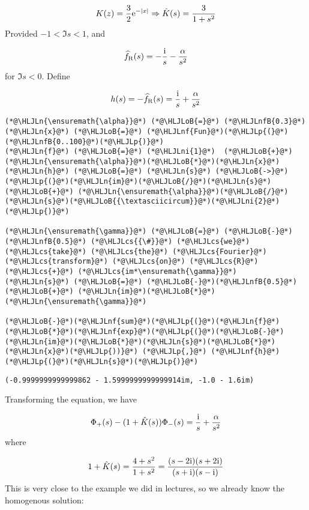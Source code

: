 \documentclass[12pt,landscape]{article}
\newcommand{\HLJLn}[1]{#1}
\newcommand{\HLJLnf}[1]{\textcolor[RGB]{66,102,213}{#1}}
\newcommand{\HLJLnfB}[1]{\textcolor[RGB]{59,151,46}{#1}}
\newcommand{\HLJLni}[1]{\textcolor[RGB]{59,151,46}{#1}}
\newcommand{\HLJLoB}[1]{\textcolor[RGB]{102,102,102}{\textbf{#1}}}
\newcommand{\HLJLp}[1]{#1}
\newcommand{\HLJLcs}[1]{\textcolor[RGB]{153,153,119}{\textit{#1}}}
\def\I{ {\rm i} }
\def\E{ {\rm e} }
\begin{document}
{\[
K(z) =  {3\over 2} \E^{-|x|} \Rightarrow \hat K(s) = {3 \over 1+s^2}
\]
Provided $-1 < \Im s < 1$, and

\[
\widehat f_{\rm R}(s) = -{\I \over s} - {\alpha \over s^2}
\]
for $\Im s < 0$.  Define

\[
h(s) = - \widehat f_{\rm R}(s) = {\I \over s} + {\alpha \over s^2}
\]

\begin{lstlisting}
(*@\HLJLn{\ensuremath{\alpha}}@*) (*@\HLJLoB{=}@*) (*@\HLJLnfB{0.3}@*)
(*@\HLJLn{x}@*) (*@\HLJLoB{=}@*) (*@\HLJLnf{Fun}@*)(*@\HLJLp{(}@*)(*@\HLJLnfB{0..100}@*)(*@\HLJLp{)}@*)
(*@\HLJLn{f}@*) (*@\HLJLoB{=}@*) (*@\HLJLni{1}@*)  (*@\HLJLoB{+}@*) (*@\HLJLn{\ensuremath{\alpha}}@*)(*@\HLJLoB{*}@*)(*@\HLJLn{x}@*)
(*@\HLJLn{h}@*) (*@\HLJLoB{=}@*) (*@\HLJLn{s}@*) (*@\HLJLoB{->}@*) (*@\HLJLp{(}@*)(*@\HLJLn{im}@*)(*@\HLJLoB{/}@*)(*@\HLJLn{s}@*) (*@\HLJLoB{+}@*) (*@\HLJLn{\ensuremath{\alpha}}@*)(*@\HLJLoB{/}@*)(*@\HLJLn{s}@*)(*@\HLJLoB{{\textasciicircum}}@*)(*@\HLJLni{2}@*)(*@\HLJLp{)}@*)

(*@\HLJLn{\ensuremath{\gamma}}@*) (*@\HLJLoB{=}@*) (*@\HLJLoB{-}@*)(*@\HLJLnfB{0.5}@*) (*@\HLJLcs{{\#}}@*) (*@\HLJLcs{we}@*) (*@\HLJLcs{take}@*) (*@\HLJLcs{the}@*) (*@\HLJLcs{Fourier}@*) (*@\HLJLcs{transform}@*) (*@\HLJLcs{on}@*) (*@\HLJLcs{R}@*) (*@\HLJLcs{+}@*) (*@\HLJLcs{im*\ensuremath{\gamma}}@*)
(*@\HLJLn{s}@*) (*@\HLJLoB{=}@*) (*@\HLJLoB{-}@*)(*@\HLJLnfB{0.5}@*) (*@\HLJLoB{+}@*) (*@\HLJLn{im}@*)(*@\HLJLoB{*}@*)(*@\HLJLn{\ensuremath{\gamma}}@*)

(*@\HLJLoB{-}@*)(*@\HLJLnf{sum}@*)(*@\HLJLp{(}@*)(*@\HLJLn{f}@*)(*@\HLJLoB{*}@*)(*@\HLJLnf{exp}@*)(*@\HLJLp{(}@*)(*@\HLJLoB{-}@*)(*@\HLJLn{im}@*)(*@\HLJLoB{*}@*)(*@\HLJLn{s}@*)(*@\HLJLoB{*}@*)(*@\HLJLn{x}@*)(*@\HLJLp{))}@*) (*@\HLJLp{,}@*) (*@\HLJLnf{h}@*)(*@\HLJLp{(}@*)(*@\HLJLn{s}@*)(*@\HLJLp{)}@*)
\end{lstlisting}

\begin{lstlisting}
(-0.9999999999999862 - 1.5999999999999914im, -1.0 - 1.6im)
\end{lstlisting}


Transforming the equation, we have

\[
\Phi_+(s) - (1 + \hat K(s)) \Phi_-(s)  = {\I \over s} + {\alpha \over s^2}
\]
where

\[
1 + \hat K(s) = {4 + s^2 \over 1 + s^2} = {(s-2 \I) (s+2 \I) \over (s+\I)(s-\I)}
\]
This is very close to the example we did in lectures, so we already know the homogenous solution:

}
\end{document}
